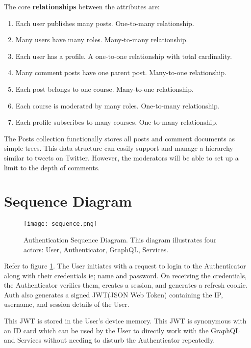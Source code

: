 The core \textbf{relationships} between the attributes are:
\begin{enumerate}
    \item Each user publishes many posts. One-to-many relationship.
    \item Many users have many roles. Many-to-many relationship.
    \item Each user has a profile. A one-to-one relationship with total cardinality.
    \item Many comment posts have one parent post. Many-to-one relationship.
    \item Each post belongs to one course. Many-to-one relationship.
    \item Each course is moderated by many roles. One-to-many relationship.
    \item Each profile subscribes to many courses. One-to-many relationship.
\end{enumerate}

The Posts collection functionally stores all posts and comment documents as simple trees. This data structure can easily support and manage a hierarchy similar to tweets on Twitter. However, the moderators will be able to set up a limit to the depth of comments.

\section{Sequence Diagram}

\begin{figure}[h!]
    \begin{center}
        \texttt{[image: sequence.png]}
    \end{center}
    \caption{Authentication Sequence Diagram. This diagram illustrates 
    four actors: User, Authenticator, GraphQL, Services.}
    \label{fig:sequence}
\end{figure}

Refer to figure \ref{fig:sequence}.
The User initiates with a request to login to the Authenticator along with their credentials ie; name and password.
On receiving the credentials, the Authenticator verifies them, creates a session, and generates a refresh cookie.
Auth also generates a signed JWT(JSON Web Token) containing the IP, username, and session details of the User.

This JWT is stored in the User's device memory. This JWT is synonymous with an ID card which can be used by 
the User to directly work with the GraphQL and Services without needing to disturb the Authenticator repeatedly.

